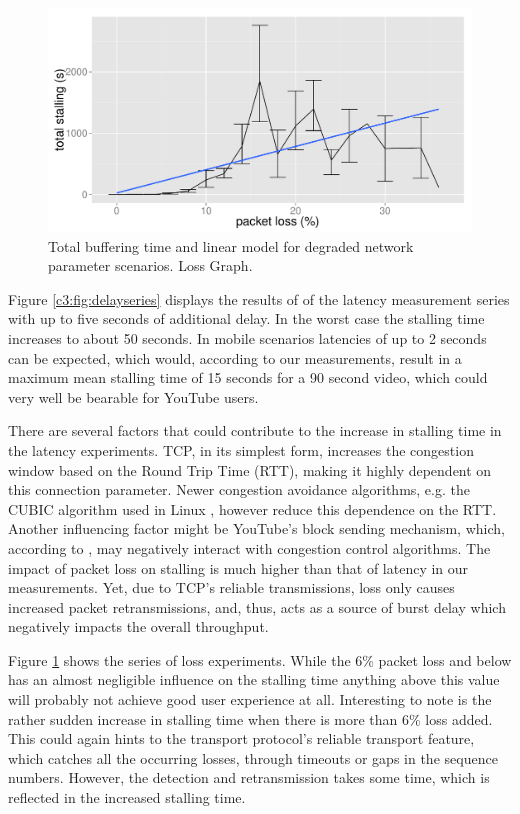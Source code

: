 \begin{figure}[htbp]
    \centering
    \includegraphics[width=\textwidth]{images/R-lossseries.pdf}
    \caption{Total buffering time and linear model for degraded network parameter scenarios. Loss Graph.}
    \label{c3:fig:lossseries}
\end{figure}

Figure \ref{c3:fig:delayseries} displays the results of of the latency measurement series with up to five seconds of additional delay. In the worst case the stalling time increases to about 50 seconds. In mobile scenarios latencies of up to 2 seconds can be expected, which would, according to our measurements, result in a maximum mean stalling time of 15 seconds for a 90 second video, which could very well be bearable for YouTube users.

There are several factors that could contribute to the increase in stalling time in the latency experiments. 
TCP, in its simplest form, increases the congestion window based on the Round Trip Time (RTT), making it highly dependent on this connection parameter. Newer congestion avoidance algorithms, e.g. the CUBIC algorithm used in Linux \cite{ha2008cubic}, however reduce this dependence on the RTT.
Another influencing factor might be YouTube's block sending mechanism, which, according to \cite{alcock2011afcyt}, may negatively interact with congestion control algorithms. The impact of packet loss on stalling is much higher than that of latency in our measurements. Yet, due to TCP's reliable transmissions, loss only causes increased packet retransmissions, and, thus, acts as a source of burst delay which negatively impacts the overall throughput.

Figure \ref{c3:fig:lossseries} shows the series of loss experiments. While the 6\% packet loss and below has an almost negligible influence on the stalling time anything above this value will probably not achieve good user experience at all. Interesting to note is the rather sudden increase in stalling time when there is more than 6\% loss added. This could again hints to the transport protocol's reliable transport feature, which catches all the occurring losses, through timeouts or gaps in the sequence numbers. However, the detection and retransmission takes some time, which is reflected in the increased stalling time.




